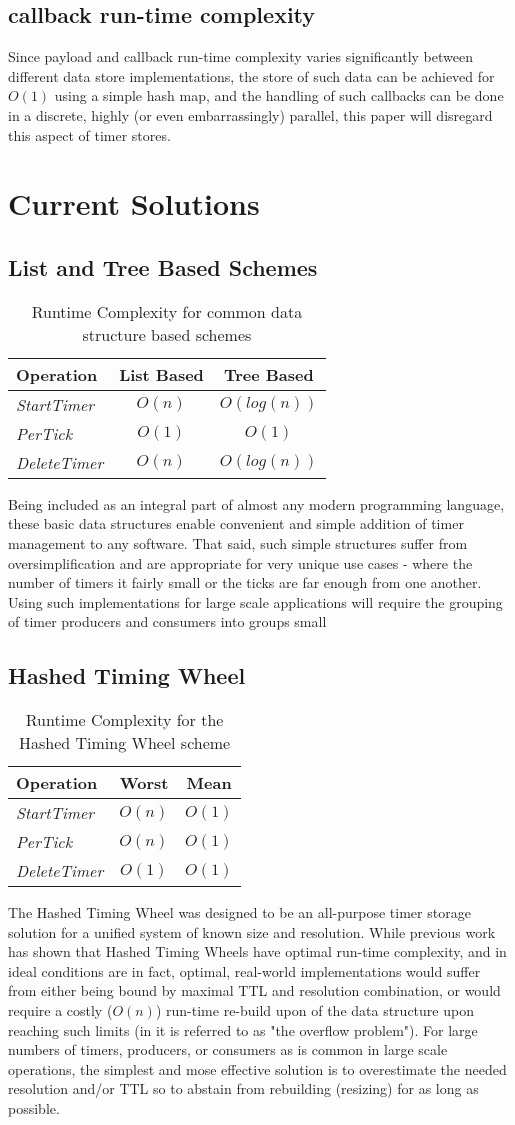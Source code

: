 \documentclass[conference]{IEEEtran}
\newcommand{\complexity}[9]{
\begin{table}[ht]
	\begin{center}
		\begin{tabular}{l|c|c}
			\textbf{Operation} & \textbf{#1} & \textbf{#2} \\
			\hline
			\textit{StartTimer} & $O(#3)$ & $O(#4)$ \\
			\textit{PerTick} & $O(#5)$ & $O(#6)$ \\
			\textit{DeleteTimer} &  $O(#7)$ & $O(#8)$ \\
		\end{tabular}
		\linebreak
		\caption{Runtime Complexity for #9}
	\end{center}
\end{table}
}
\begin{document}
\subsection{callback run-time complexity}

Since payload and callback run-time complexity varies significantly between different data store implementations, the store of such data can be achieved for $ O(1) $ using a simple hash map, and the handling of such callbacks can be done in a discrete, highly (or even embarrassingly) parallel, this paper will disregard this aspect of timer stores.


\section{Current Solutions}

\subsection{List and Tree Based Schemes}

\complexity{List Based}{Tree Based}{n}{log(n)}{1}{1}{n}{log(n)}{common data structure based schemes}

Being included as an integral part of almost any modern programming language, these basic data structures enable convenient and simple addition of timer management to any software. That said, such simple structures suffer from oversimplification and are appropriate for very unique use cases - where the number of timers it fairly small or the ticks are far enough from one another. Using such implementations for large scale applications will require the grouping of timer producers and consumers into groups small 



\subsection{Hashed Timing Wheel}
\complexity{Worst}{Mean}{n}{1}{n}{1}{1}{1}{the Hashed Timing Wheel scheme}
The Hashed Timing Wheel was designed to be an all-purpose timer storage solution for a unified system of known size and resolution\cite{TW87, TW, TWI, largescale, autoscale}. While previous work has shown that Hashed Timing Wheels have optimal run-time complexity, and in ideal conditions are in fact, optimal, real-world implementations would suffer from either being bound by maximal TTL and resolution combination, or would require a costly ($O(n)$) run-time re-build upon of the data structure upon reaching such limits (in \cite{CQ} it is referred to as "the overflow problem"). For large numbers of timers, producers, or consumers as is common in large scale operations, the simplest and mose effective solution is to overestimate the needed resolution and/or TTL so to abstain from rebuilding (resizing) for as long as possible.
\end{document}
